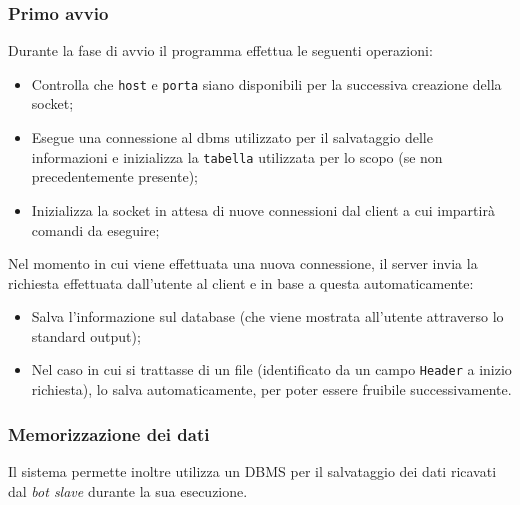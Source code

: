 \documentclass[letterpaper, 11pt]{article}
\begin{document}
\subsubsection{Primo avvio}
\label{Primo avvio (Bot master)}
Durante la fase di avvio il programma effettua le seguenti operazioni:
\begin{itemize}
\item Controlla che \texttt{host} e \texttt{porta} \autocite{infoHostPortMaster} siano disponibili per la successiva creazione della socket;
\item Esegue una connessione al dbms utilizzato per il salvataggio delle informazioni e inizializza la \texttt{tabella} utilizzata per lo scopo (se non precedentemente presente);
\item Inizializza la socket in attesa di nuove connessioni dal client a cui impartirà comandi da eseguire;
\end{itemize}

Nel momento in cui viene effettuata una nuova connessione, il server invia la richiesta effettuata dall'utente al client e in base a questa automaticamente:
\begin{itemize}
\item Salva l'informazione sul database (che viene mostrata all'utente attraverso lo standard output);
\item Nel caso in cui si trattasse di un file (identificato da un campo \texttt{Header} a inizio richiesta), lo salva automaticamente, per poter essere fruibile successivamente.
\end{itemize}
\subsubsection{Memorizzazione dei dati}
\label{Memorizzazione dati (Bot master)}
Il sistema permette inoltre utilizza un DBMS \autocite{postgres} per il salvataggio dei dati ricavati dal \emph{bot slave} durante la sua esecuzione.
\end{document}
